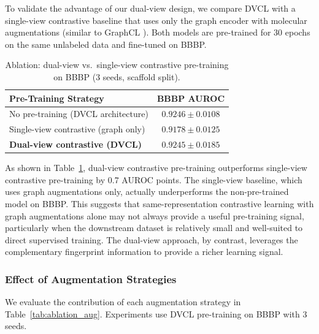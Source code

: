 \documentclass[a4paper,fleqn]{cas-sc}
\begin{document}
To validate the advantage of our dual-view design, we compare DVCL with a single-view contrastive baseline that uses only the graph encoder with molecular augmentations (similar to GraphCL \citep{you2020graph}). Both models are pre-trained for 30 epochs on the same unlabeled data and fine-tuned on BBBP.

\begin{table}[!t]
\centering
\caption{Ablation: dual-view vs.\ single-view contrastive pre-training on BBBP (3 seeds, scaffold split).}
\label{tab:ablation_view}
\begin{tabular}{l c}
\toprule
\textbf{Pre-Training Strategy} & \textbf{BBBP AUROC} \\
\midrule
No pre-training (DVCL architecture)          & $0.9246 \pm 0.0108$ \\
Single-view contrastive (graph only)         & $0.9178 \pm 0.0125$ \\
\textbf{Dual-view contrastive (DVCL)}        & $\mathbf{0.9245 \pm 0.0185}$ \\
\bottomrule
\end{tabular}
\end{table}

As shown in Table~\ref{tab:ablation_view}, dual-view contrastive pre-training outperforms single-view contrastive pre-training by 0.7 AUROC points. The single-view baseline, which uses graph augmentations only, actually underperforms the non-pre-trained model on BBBP. This suggests that same-representation contrastive learning with graph augmentations alone may not always provide a useful pre-training signal, particularly when the downstream dataset is relatively small and well-suited to direct supervised training. The dual-view approach, by contrast, leverages the complementary fingerprint information to provide a richer learning signal.

\subsubsection{Effect of Augmentation Strategies}

We evaluate the contribution of each augmentation strategy in Table~\ref{tab:ablation_aug}. Experiments use DVCL pre-training on BBBP with 3 seeds.
\end{document}
